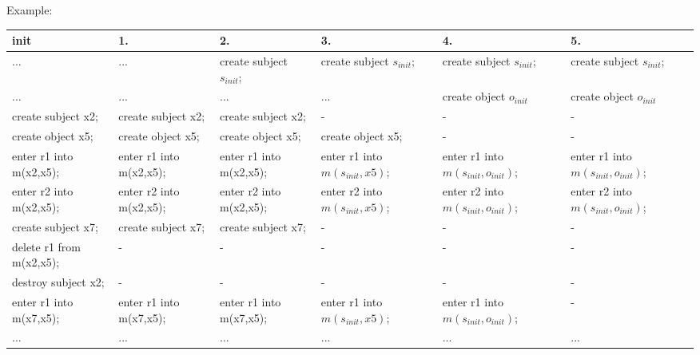 \documentclass[a4paper]{article}
\begin{document}
\begin{multicols}{3}
    Example:
    \begin{tabular}{l|l|l|l|l|l}
        init                     & 1.                      & 2.                         & 3.                              & 4.                                    & 5.                                    \\\hline
        ...                      & ...                     & create subject $s_{init}$; & create subject $s_{init}$;      & create subject $s_{init}$;            & create subject $s_{init}$;            \\
        ...                      & ...                     & ...                        & ...                             & create object $o_{init}$              & create object $o_{init}$              \\
        create subject x2;       & create subject x2;      & create subject x2;         & -                               & -                                     & -                                     \\
        create object x5;        & create object x5;       & create object x5;          & create object x5;               & -                                     & -                                     \\
        enter r1 into m(x2,x5);  & enter r1 into m(x2,x5); & enter r1 into m(x2,x5);    & enter r1 into $m(s_{init},x5)$; & enter r1 into $m(s_{init},o_{init})$; & enter r1 into $m(s_{init},o_{init})$; \\
        enter r2 into m(x2,x5);  & enter r2 into m(x2,x5); & enter r2 into m(x2,x5);    & enter r2 into $m(s_{init},x5)$; & enter r2 into $m(s_{init},o_{init})$; & enter r2 into $m(s_{init},o_{init})$; \\
        create subject x7;       & create subject x7;      & create subject x7;         & -                               & -                                     & -                                     \\
        delete r1 from m(x2,x5); & -                       & -                          & -                               & -                                     & -                                     \\
        destroy subject x2;      & -                       & -                          & -                               & -                                     & -                                     \\
        enter r1 into m(x7,x5);  & enter r1 into m(x7,x5); & enter r1 into m(x7,x5);    & enter r1 into $m(s_{init},x5)$; & enter r1 into $m(s_{init},o_{init})$; & -                                     \\
        ...                      & ...                     & ...                        & ...                             & ...                                   & ...
    \end{tabular}


\end{multicols}
\end{document}
